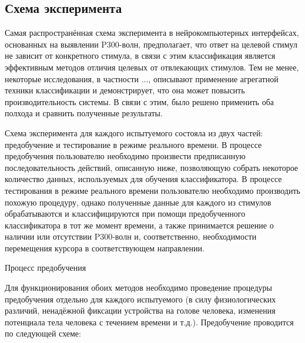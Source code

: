 \documentclass[12pt,fleqn]{article}
\begin{document}
\subsection{Схема эксперимента}
	\par Самая распространённая схема эксперимента в нейрокомпьютерных интерфейсах, основанных на выявлении P300-волн, предполагает, что ответ на целевой стимул не зависит от конкретного стимула, в связи с этим классификация является эффективным методов отличия целевых от отвлекающих стимулов. Тем не менее, некоторые исследования, в частности ..., описывают применение агрегатной техники классификации и демонстрирует, что она может повысить производительность системы. В связи с этим, было решено применить оба полхода и сравнить полученные результаты.
	\par Схема эксперимента для каждого испытуемого состояла из двух частей: предобучение и тестирование в режиме реального времени. В процессе предобучения пользователю необходимо произвести предписанную последовательность действий, описанную ниже, позволяющую собрать некоторое количество данных, используемых для обучения классификатора. В процессе тестирования в режиме реального времени пользователю необходимо производить похожую процедуру, однако полученные данные для каждого из стимулов обрабатываются и классифицируются при помощи предобученного классификатора в тот же момент времени, а также принимается решение о наличии или отсутствии P300-волн и, соответственно, необходимости перемещения курсора в соответствующем направлении.
	\par Процесс предобучения
	\par Для функционирования обоих методов необходимо проведение процедуры предобучения отдельно для каждого испытуемого (в силу физиологических различий, ненадёжной фиксации устройства на голове человека, изменения потенциала тела человека с течением времени и т.д.). Предобучение проводится по следующей схеме:
\end{document}
